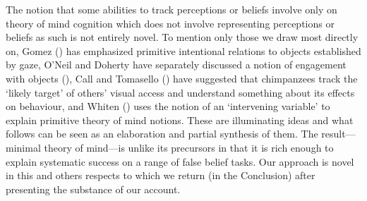\documentclass[12pt,\papersize]{extarticle}
\begin{document}
The notion that some abilities to track perceptions or beliefs involve only on theory of mind cognition which does not involve representing perceptions or beliefs as such is not entirely novel.
To mention only those we draw most directly on, Gomez (\citeyear[][p.\ 730]{en_1259}) has emphasized primitive intentional relations to objects established by gaze, O’Neil and Doherty have separately discussed a notion of engagement with objects (\citealp{en_1159, en_1140}), Call and Tomasello (\citeyear[][p.\ 58]{en_1669}) have suggested that chimpanzees track the `likely target' of others’ visual access and understand something about its effects on behaviour, and Whiten (\citeyear[]{en_1415, en_1416}) uses the notion of an `intervening variable' to explain primitive theory of mind notions.  These are illuminating ideas and what follows can be seen as an elaboration and partial synthesis of them.  
The result---minimal theory of mind---is unlike its precursors in that it is rich enough to explain systematic success on a range of false belief tasks.  Our approach is novel in this and others respects to which we return (in the Conclusion) after presenting the substance of our account.



%
%
\end{document}
